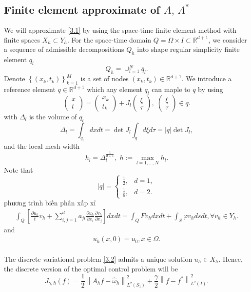 \documentclass[]{article}
\begin{document}
\subsection{Finite element approximate of $A,\, A^*$}
We will approximate \eqref{3.1} by using the space-time finite element method with finite spaces $X_h \subset Y_h$. For the space-time domain $Q=\Omega\times I\subset \mathbb{R}^{d+1}$, we consider a sequence of admissible decompositions $Q_h$ into shape regular simplicity finite element $q_l$
$$Q_h=\cup_{l=1}^{N}\bar{q}_l.$$
Denote $\left\lbrace (x_k, t_k)\right\rbrace_{k=1}^M $ is a set of nodes $(x_k, t_k)\in \mathbb{R}^{d+1}$. We introduce a reference element $q\in \mathbb{R}^{d+1}$ which any element $q_l$ can maple to $q$ by using
$$\begin{pmatrix}x\\t\end{pmatrix}=\begin{pmatrix}x_k\\t_k\end{pmatrix}+J_l\begin{pmatrix}\xi\\\tau\end{pmatrix}, \; \begin{pmatrix}\xi\\\tau\end{pmatrix}\in q.$$
with $\Delta_l$ is the volume of $q_l$ 
$$\Delta_l=\int_{q_l}dxdt=\det J_l\int_q d\xi d\tau=|q|\det J_l,$$
and the local mesh width
$$h_l=\Delta_l^{\frac{1}{d+1}},\; h:=\max_{l=1, ..., N}h_l.$$
Note that
$$|q|=\begin{cases}
	\frac{1}{2},& d=1,\\[0.1cm]
	\frac{1}{6},& d=2.
\end{cases}$$
phương trình biến phân xấp xỉ
\begin{align}\label{3.2}
	\int_{Q}\left[\frac{\partial u_h}{t}v_h+\sum_{i, j=1}^{d}a_{ji}\frac{\partial u_h}{\partial x_i}\frac{\partial v_h}{\partial x_j}\right]dxdt=\int_{Q}Fv_hdxdt+\int_{S}\varphi v_hdsdt, \forall v_h\in Y_h.
\end{align}
and 
\begin{align}\label{3.3}
	u_h(x, 0)=u_0, x\in \Omega.
\end{align}
\\
The discrete variational problem \eqref{3.2} admits a unique solution $u_h\in X_h$. Hence, the discrete version of the optimal control problem will be
$$J_{\gamma, h}(f)=\frac{1}{2}\left\|A_hf-\hat{\omega}_h\right\|^2_{L^2(S_1)}+\frac{\gamma}{2}\left\|f-f^*\right\|^2_{L^2(I)}.$$
\end{document}

